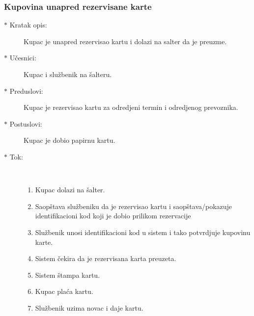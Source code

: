 \subsubsection{Kupovina unapred rezervisane karte}
\begin{description}
	\item[$\ast$ Kratak opis: ] Kupac je unapred rezervisao kartu i dolazi na salter da je preuzme.
	\item[$\ast$ U\v cesnici: ] Kupac i slu\v zbenik na \v salteru.
	\item[$\ast$ Preduslovi: ] Kupac je rezervisao kartu za odredjeni termin i odredjenog prevoznika.
	\item[$\ast$ Postuslovi: ] Kupac je dobio papirnu kartu.
	\item[$\ast$ Tok: ] \ \\
	\begin{enumerate}
		\item Kupac dolazi na \v salter.
		\item Saop\v stava slu\v zbeniku da je rezervisao kartu i saop\v stava/pokazuje identifikacioni kod koji je dobio prilikom rezervacije
		\item Slu\v zbenik unosi identifikacioni kod u sistem i tako potvrdjuje kupovinu karte.
		\item Sistem \v cekira da je rezervisana karta preuzeta.
		\item Sistem \v stampa kartu.
		\item Kupac pla\'ca kartu.
		\item Slu\v zbenik uzima novac i daje kartu.
	\end{enumerate}
\end{description}

